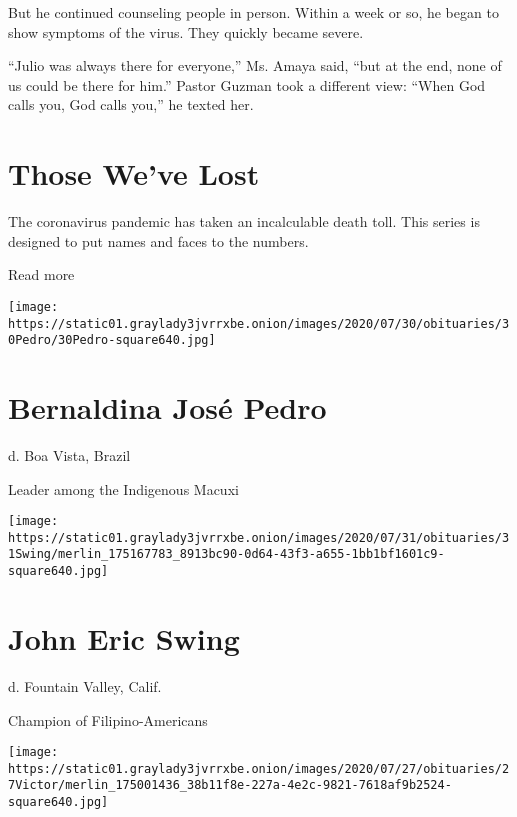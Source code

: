 But he continued counseling people in person. Within a week or so, he
began to show symptoms of the virus. They quickly became severe.

``Julio was always there for everyone,'' Ms. Amaya said, ``but at the
end, none of us could be there for him.'' Pastor Guzman took a different
view: ``When God calls you, God calls you,'' he texted her.

\href{https://www.nytimes3xbfgragh.onion/interactive/2020/obituaries/people-died-coronavirus-obituaries.html?action=click\&pgtype=Article\&state=default\&region=BELOW_MAIN_CONTENT\&context=covid_obits_promo}{}

\hypertarget{those-weve-lost}{%
\section{Those We've Lost}\label{those-weve-lost}}

The coronavirus pandemic has taken an incalculable death toll. This
series is designed to put names and faces to the numbers.

Read more

\texttt{[image: https://static01.graylady3jvrrxbe.onion/images/2020/07/30/obituaries/30Pedro/30Pedro-square640.jpg]}

\hypertarget{bernaldina-josuxe9-pedro}{%
\section{Bernaldina José Pedro}\label{bernaldina-josuxe9-pedro}}

d. Boa Vista, Brazil

Leader among the Indigenous Macuxi

\texttt{[image: https://static01.graylady3jvrrxbe.onion/images/2020/07/31/obituaries/31Swing/merlin\_175167783\_8913bc90-0d64-43f3-a655-1bb1bf1601c9-square640.jpg]}

\hypertarget{john-eric-swing}{%
\section{John Eric Swing}\label{john-eric-swing}}

d. Fountain Valley, Calif.

Champion of Filipino-Americans

\texttt{[image: https://static01.graylady3jvrrxbe.onion/images/2020/07/27/obituaries/27Victor/merlin\_175001436\_38b11f8e-227a-4e2c-9821-7618af9b2524-square640.jpg]}

